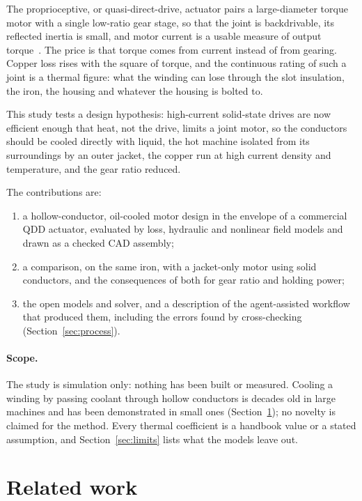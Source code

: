 \documentclass[11pt]{article}
\begin{document}
The proprioceptive, or quasi-direct-drive, actuator pairs a large-diameter
torque motor with a single low-ratio gear stage, so that the joint is
backdrivable, its reflected inertia is small, and motor current is a usable
measure of output torque~\cite{wensing2017,seok2015,katz2018}. The price is
that torque comes from current instead of from gearing. Copper loss rises with
the square of torque, and the continuous rating of such a joint is a thermal
figure: what the winding can lose through the slot insulation, the iron, the
housing and whatever the housing is bolted to.

This study tests a design hypothesis: high-current solid-state drives are now
efficient enough that heat, not the drive, limits a joint motor, so the
conductors should be cooled directly with liquid, the hot machine isolated
from its surroundings by an outer jacket, the copper run at high current
density and temperature, and the gear ratio reduced.

The contributions are:

\begin{enumerate}
\item a hollow-conductor, oil-cooled motor design in the envelope of a
  commercial QDD actuator, evaluated by loss, hydraulic and nonlinear field
  models and drawn as a checked CAD assembly;
\item a comparison, on the same iron, with a jacket-only motor using solid
  conductors, and the consequences of both for gear ratio and holding power;
\item the open models and solver, and a description of the agent-assisted
  workflow that produced them, including the errors found by cross-checking
  (Section~\ref{sec:process}).
\end{enumerate}

\paragraph{Scope.} The study is simulation only: nothing has been built or
measured. Cooling a winding by passing coolant through hollow conductors is
decades old in large machines and has been demonstrated in small ones
(Section~\ref{sec:related}); no novelty is claimed for the method. Every
thermal coefficient is a handbook value or a stated assumption, and
Section~\ref{sec:limits} lists what the models leave out.

\section{Related work}
\label{sec:related}
\end{document}
